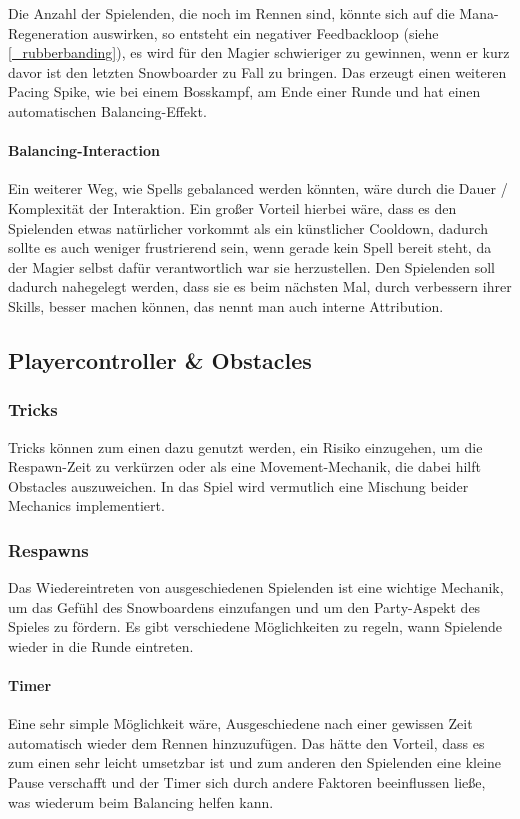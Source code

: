 Die Anzahl der Spielenden, die noch im Rennen sind, könnte sich auf die Mana-Regeneration auswirken, so entsteht ein negativer Feedbackloop (siehe \ref{_rubberbanding}), es wird für den Magier schwieriger zu gewinnen, wenn er kurz davor ist den letzten Snowboarder zu Fall zu bringen. Das erzeugt einen weiteren Pacing Spike, wie bei einem Bosskampf, am Ende einer Runde und hat einen automatischen Balancing\cite[S. 296]{_game_design_workshop}-Effekt.

\paragraph{Balancing-Interaction\label{_balancing_interaction}}
Ein weiterer Weg, wie Spells gebalanced werden könnten, wäre durch die Dauer / Komplexität der Interaktion. Ein großer Vorteil hierbei wäre, dass es den Spielenden etwas natürlicher vorkommt als ein künstlicher Cooldown, dadurch sollte es auch weniger frustrierend sein, wenn gerade kein Spell bereit steht, da der Magier selbst dafür verantwortlich war sie herzustellen. Den Spielenden soll dadurch nahegelegt werden, dass sie es beim nächsten Mal, durch verbessern ihrer Skills, besser machen können, das nennt man auch interne Attribution\cite{_internal_attribution}.

\subsection{Playercontroller \& Obstacles\label{_playercontroller}}
\subsubsection{Tricks}
Tricks können zum einen dazu genutzt werden, ein Risiko einzugehen, um die Respawn-Zeit zu verkürzen oder als eine Movement-Mechanik, die dabei hilft Obstacles auszuweichen. In das Spiel wird vermutlich eine Mischung beider Mechanics implementiert.

\subsubsection{Respawns}
Das Wiedereintreten von ausgeschiedenen Spielenden ist eine wichtige Mechanik, um das Gefühl des Snowboardens einzufangen und um den Party-Aspekt des Spieles zu fördern. Es gibt verschiedene Möglichkeiten zu regeln, wann Spielende wieder in die Runde eintreten.

\paragraph{Timer}
Eine sehr simple Möglichkeit wäre, Ausgeschiedene nach einer gewissen Zeit automatisch wieder dem Rennen hinzuzufügen. Das hätte den Vorteil, dass es zum einen sehr leicht umsetzbar ist und zum anderen den Spielenden eine kleine Pause verschafft und der Timer sich durch andere Faktoren beeinflussen ließe, was wiederum beim Balancing helfen kann.

